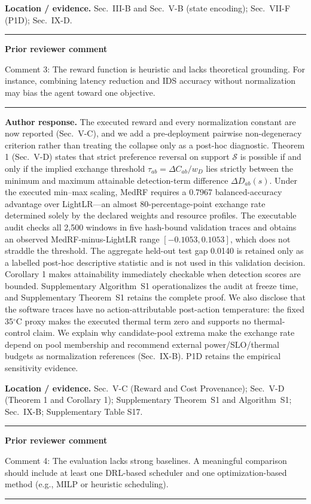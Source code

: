 \documentclass[11pt]{article}
\newenvironment{qbox}
    {\par\vspace{4pt}\noindent\begin{minipage}{\linewidth}\rule{\linewidth}{0.4pt}\par\noindent\textbf{Prior reviewer comment}\par\noindent}
    {\par\rule{\linewidth}{0.4pt}\end{minipage}\par\vspace{4pt}}
\begin{document}
\textbf{Location / evidence.} Sec.~III-B and Sec.~V-B (state encoding); Sec.~VII-F (P1D); Sec.~IX-D.

\begin{qbox}
Comment 3: The reward function is heuristic and lacks theoretical grounding. For instance, combining latency reduction and IDS accuracy without normalization may bias the agent toward one objective.
\end{qbox}

\textbf{Author response.} The executed reward and every normalization constant are now reported (Sec.~V-C), and we add a pre-deployment pairwise non-degeneracy criterion rather than treating the collapse only as a post-hoc diagnostic. Theorem 1 (Sec.~V-D) states that strict preference reversal on support $\mathcal S$ is possible if and only if the implied exchange threshold $\tau_{ab}=\Delta C_{ab}/w_D$ lies strictly between the minimum and maximum attainable detection-term difference $\Delta D_{ab}(s)$. Under the executed min--max scaling, MedRF requires a 0.7967 balanced-accuracy advantage over LightLR---an almost 80-percentage-point exchange rate determined solely by the declared weights and resource profiles. The executable audit checks all 2{,}500 windows in five hash-bound validation traces and obtains an observed MedRF-minus-LightLR range $[-0.1053,0.1053]$, which does not straddle the threshold. The aggregate held-out test gap 0.0140 is retained only as a labelled post-hoc descriptive statistic and is not used in this validation decision. Corollary 1 makes attainability immediately checkable when detection scores are bounded. Supplementary Algorithm~S1 operationalizes the audit at freeze time, and Supplementary Theorem~S1 retains the complete proof. We also disclose that the software traces have no action-attributable post-action temperature: the fixed 35$^{\circ}$C proxy makes the executed thermal term zero and supports no thermal-control claim. We explain why candidate-pool extrema make the exchange rate depend on pool membership and recommend external power/SLO/thermal budgets as normalization references (Sec.~IX-B). P1D retains the empirical sensitivity evidence.

\textbf{Location / evidence.} Sec.~V-C (Reward and Cost Provenance); Sec.~V-D (Theorem 1 and Corollary 1); Supplementary Theorem~S1 and Algorithm~S1; Sec.~IX-B; Supplementary Table S17.

\begin{qbox}
Comment 4: The evaluation lacks strong baselines. A meaningful comparison should include at least one DRL-based scheduler and one optimization-based method (e.g., MILP or heuristic scheduling).
\end{qbox}
\end{document}
